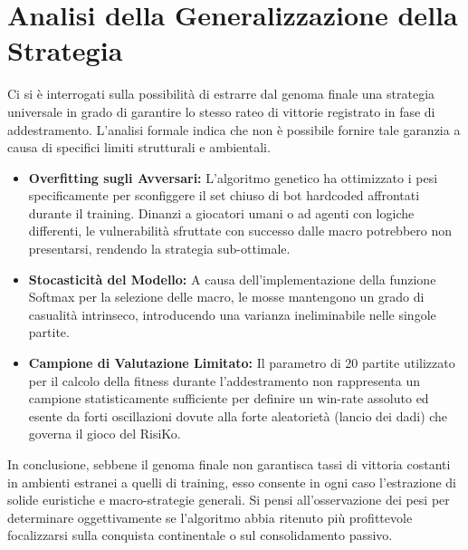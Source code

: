 \documentclass[12pt,a4paper]{article}
\begin{document}
\section{Analisi della Generalizzazione della Strategia}
Ci si è interrogati sulla possibilità di estrarre dal genoma finale una strategia universale in grado di garantire lo stesso rateo di vittorie registrato in fase di addestramento. L'analisi formale indica che non è possibile fornire tale garanzia a causa di specifici limiti strutturali e ambientali.
\begin{itemize}
    \item \textbf{Overfitting sugli Avversari:} L'algoritmo genetico ha ottimizzato i pesi specificamente per sconfiggere il set chiuso di bot hardcoded affrontati durante il training. Dinanzi a giocatori umani o ad agenti con logiche differenti, le vulnerabilità sfruttate con successo dalle macro potrebbero non presentarsi, rendendo la strategia sub-ottimale.
    \item \textbf{Stocasticità del Modello:} A causa dell'implementazione della funzione Softmax per la selezione delle macro, le mosse mantengono un grado di casualità intrinseco, introducendo una varianza ineliminabile nelle singole partite.
    \item \textbf{Campione di Valutazione Limitato:} Il parametro di 20 partite utilizzato per il calcolo della fitness durante l'addestramento non rappresenta un campione statisticamente sufficiente per definire un win-rate assoluto ed esente da forti oscillazioni dovute alla forte aleatorietà (lancio dei dadi) che governa il gioco del RisiKo.
\end{itemize}
In conclusione, sebbene il genoma finale non garantisca tassi di vittoria costanti in ambienti estranei a quelli di training, esso consente in ogni caso l'estrazione di solide euristiche e macro-strategie generali. Si pensi all'osservazione dei pesi per determinare oggettivamente se l'algoritmo abbia ritenuto più profittevole focalizzarsi sulla conquista continentale o sul consolidamento passivo.
\end{document}
